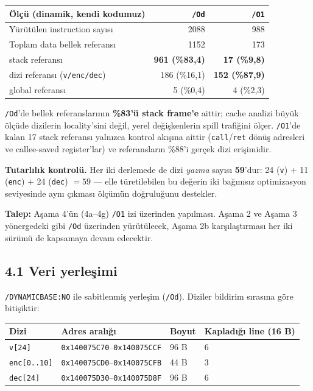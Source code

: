 \documentclass[11pt,a4paper]{article}
\newcommand{\tl}{\texttt}
\begin{document}
\begin{longtable}{p{6.2cm}rr}
\toprule
\textbf{Ölçü (dinamik, kendi kodumuz)} & \textbf{\tl{/Od}} & \textbf{\tl{/O1}}\\
\midrule
Yürütülen instruction sayısı & 2088 & 988\\
Toplam data bellek referansı & 1152 & 173\\
\midrule
\quad stack referansı        & \textbf{961 (\%83{,}4)} & \textbf{17 (\%9{,}8)}\\
\quad dizi referansı (\tl{v/enc/dec}) & 186 (\%16{,}1) & \textbf{152 (\%87{,}9)}\\
\quad global referansı       & 5 (\%0{,}4) & 4 (\%2{,}3)\\
\bottomrule
\end{longtable}

\tl{/Od}'de bellek referanslarının \textbf{\%83'ü stack frame'e} aittir; cache analizi büyük
ölçüde dizilerin locality'sini değil, yerel değişkenlerin spill trafiğini ölçer. \tl{/O1}'de kalan
17 stack referansı yalnızca kontrol akışına aittir (\tl{call}/\tl{ret} dönüş adresleri ve
callee-saved register'lar) ve referansların \%88'i gerçek dizi erişimidir.

\textbf{Tutarlılık kontrolü.} Her iki derlemede de dizi \textit{yazma} sayısı \textbf{59}'dur:
24 (\tl{v}) $+$ 11 (\tl{enc}) $+$ 24 (\tl{dec}) $= 59$ --- elle türetilebilen bu değerin iki
bağımsız optimizasyon seviyesinde aynı çıkması ölçümün doğruluğunu destekler.

\textbf{Talep:} Aşama 4'ün (4a--4g) \tl{/O1} izi üzerinden yapılması. Aşama 2 ve Aşama 3
yönergedeki gibi \tl{/Od} üzerinden yürütülecek, Aşama 2b karşılaştırması her iki sürümü de
kapsamaya devam edecektir.

\subsection*{4.1 Veri yerleşimi}

\tl{/DYNAMICBASE:NO} ile sabitlenmiş yerleşim (\tl{/Od}). Diziler bildirim sırasına göre
bitişiktir:

\begin{longtable}{p{2.4cm}p{5.6cm}p{2.2cm}p{4.0cm}}
\toprule
\textbf{Dizi} & \textbf{Adres aralığı} & \textbf{Boyut} & \textbf{Kapladığı line (16 B)}\\
\midrule
\tl{v[24]}      & \tl{0x140075C70}--\tl{0x140075CCF} & 96 B & 6\\
\tl{enc[0..10]} & \tl{0x140075CD0}--\tl{0x140075CFB} & 44 B & 3\\
\tl{dec[24]}    & \tl{0x140075D30}--\tl{0x140075D8F} & 96 B & 6\\
\bottomrule
\end{longtable}
\end{document}
